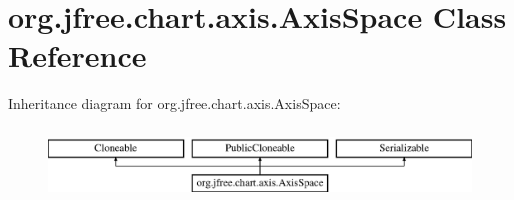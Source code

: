 \hypertarget{classorg_1_1jfree_1_1chart_1_1axis_1_1_axis_space}{}\section{org.\+jfree.\+chart.\+axis.\+Axis\+Space Class Reference}
\label{classorg_1_1jfree_1_1chart_1_1axis_1_1_axis_space}
Inheritance diagram for org.\+jfree.\+chart.\+axis.\+Axis\+Space\+:\begin{figure}[H]
\begin{center}
\leavevmode
\includegraphics[height=1.944445cm]{classorg_1_1jfree_1_1chart_1_1axis_1_1_axis_space}
\end{center}
\end{figure}

